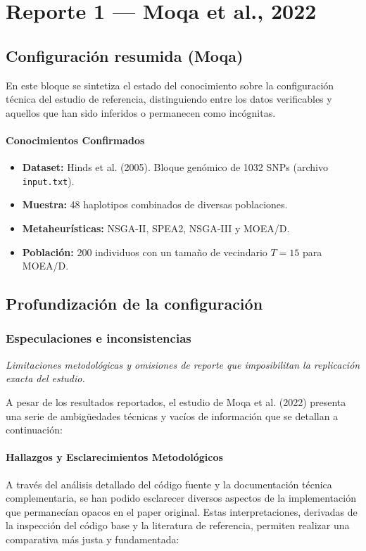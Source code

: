 \documentclass[a4paper,10pt]{article} %
\begin{document}
\newpage
\tableofcontents

\section{Reporte 1 — Moqa et al., 2022}
\subsection{Configuración resumida (Moqa)}
En este bloque se sintetiza el estado del conocimiento sobre la configuración técnica del estudio de referencia, distinguiendo entre los datos verificables y aquellos que han sido inferidos o permanecen como incógnitas.


 \paragraph{Conocimientos Confirmados}
 \begin{itemize}
     \item \textbf{Dataset:} Hinds et al. (2005). Bloque genómico de 1032 SNPs (archivo \texttt{input.txt}).
     \item \textbf{Muestra:} 48 haplotipos combinados de diversas poblaciones.
     \item \textbf{Metaheurísticas:} NSGA-II, SPEA2, NSGA-III y MOEA/D.
     \item \textbf{Población:} 200 individuos con un tamaño de vecindario $T=15$ para MOEA/D.
 \end{itemize}


\subsection{Profundización de la configuración}
\label{sec:marco_repro_moqa}

\subsubsection{Especulaciones e inconsistencias}
\textit{Limitaciones metodológicas y omisiones de reporte que imposibilitan la replicación exacta del estudio.}

A pesar de los resultados reportados, el estudio de Moqa et al. (2022) presenta una serie de ambigüedades técnicas y vacíos de información que se detallan a continuación:

\paragraph{Hallazgos y Esclarecimientos Metodológicos}
A través del análisis detallado del código fuente y la documentación técnica complementaria, se han podido esclarecer diversos aspectos de la implementación que permanecían opacos en el paper original. Estas interpretaciones, derivadas de la inspección del código base y la literatura de referencia, permiten realizar una comparativa más justa y fundamentada:
\end{document}
